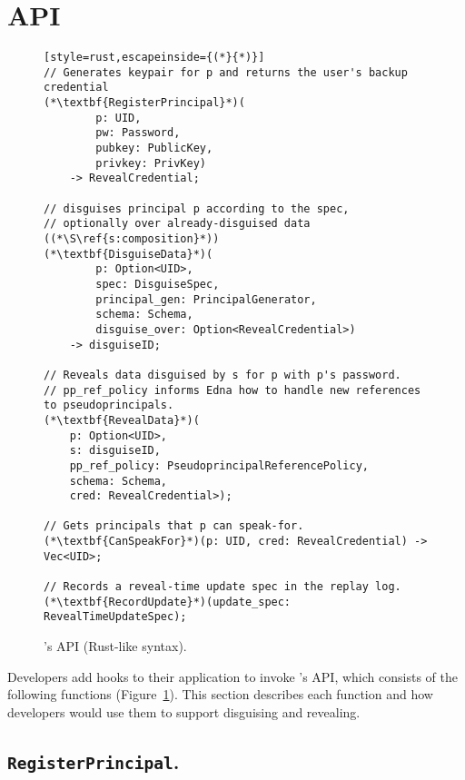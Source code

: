 \section{\sys API}
\begin{figure}[t]
\begin{lstlisting}[style=rust,escapeinside={(*}{*)}]
// Generates keypair for p and returns the user's backup credential
(*\textbf{RegisterPrincipal}*)(
        p: UID, 
        pw: Password,
        pubkey: PublicKey, 
        privkey: PrivKey)
    -> RevealCredential;

// disguises principal p according to the spec, 
// optionally over already-disguised data ((*\S\ref{s:composition}*))
(*\textbf{DisguiseData}*)(
        p: Option<UID>, 
        spec: DisguiseSpec,
        principal_gen: PrincipalGenerator,
        schema: Schema,
        disguise_over: Option<RevealCredential>) 
    -> disguiseID;

// Reveals data disguised by s for p with p's password. 
// pp_ref_policy informs Edna how to handle new references to pseudoprincipals.
(*\textbf{RevealData}*)(
    p: Option<UID>, 
    s: disguiseID, 
    pp_ref_policy: PseudoprincipalReferencePolicy,
    schema: Schema,
    cred: RevealCredential>);

// Gets principals that p can speak-for.
(*\textbf{CanSpeakFor}*)(p: UID, cred: RevealCredential) -> Vec<UID>;

// Records a reveal-time update spec in the replay log.
(*\textbf{RecordUpdate}*)(update_spec: RevealTimeUpdateSpec);
\end{lstlisting}
\caption{\sys's API (Rust-like syntax).}
\label{f:api-high}
\end{figure}
%

Developers add hooks to their application to invoke \sys's API, which consists
of the following functions (Figure~\ref{f:api-high}). This section describes
each function and how developers would use them to support disguising and
revealing.

\subsection{\texttt{RegisterPrincipal}.}

\noindent{}

